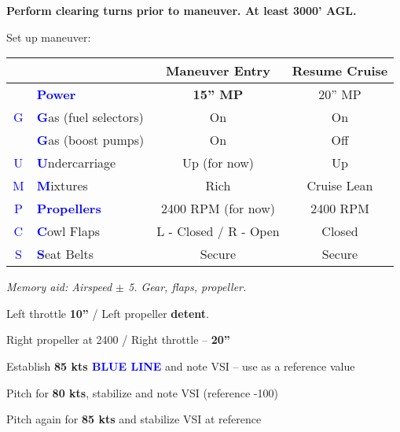 {\textbf{Perform clearing turns prior to maneuver. At least 3000' AGL.}

Set up maneuver:

\begin{table}[H]
\centering
\begin{tabular}{|c|l|c|c|}
\hline
                    &                                                 & \textbf{Maneuver Entry} & \textbf{Resume Cruise} \\ \hline
                    & \textcolor{blue}{\textbf{Power}}                & \textbf{15'' MP}        & 20'' MP                \\ \hline
\textcolor{blue}{G} & \textcolor{blue}{\textbf{G}}as (fuel selectors) & On                      & On                     \\
                    & \textcolor{blue}{\textbf{G}}as (boost pumps)    & On                      & Off                    \\ \hline
\textcolor{blue}{U} & \textcolor{blue}{\textbf{U}}ndercarriage        & Up (for now)            & Up                     \\ \hline
\textcolor{blue}{M} & \textcolor{blue}{\textbf{M}}ixtures             & Rich                    & Cruise Lean            \\ \hline
\textcolor{blue}{P} & \textcolor{blue}{\textbf{Propellers}}           & 2400 RPM (for now)      & 2400 RPM               \\ \hline
\textcolor{blue}{C} & \textcolor{blue}{\textbf{C}}owl Flaps           & L - Closed / R - Open   & Closed                 \\ \hline
\textcolor{blue}{S} & \textcolor{blue}{\textbf{S}}eat Belts           & Secure                  & Secure                 \\ \hline
\end{tabular}
\end{table}

\emph{Memory aid: Airspeed $\pm$ 5. Gear, flaps, propeller.}

Left throttle \textbf{10''} / Left propeller \textbf{detent}.

Right propeller at 2400 / Right throttle – \textbf{20''}

Establish \vyse \textbf{85 kts \textcolor{blue}{BLUE LINE}} and note VSI – use as a reference value

Pitch for \textbf{80 kts}, stabilize and note VSI (reference -100)

Pitch again for \textbf{85 kts} and stabilize VSI at reference

}
